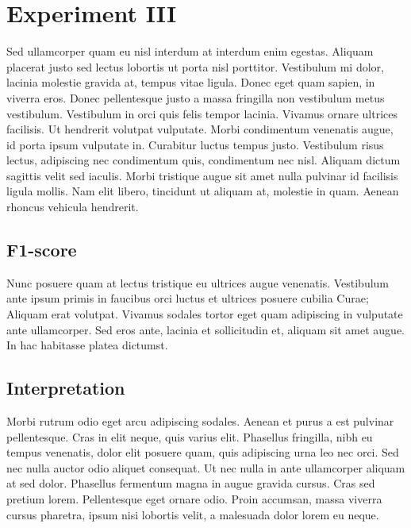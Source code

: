 
\section{Experiment III}

Sed ullamcorper quam eu nisl interdum at interdum enim egestas. Aliquam placerat justo sed lectus lobortis ut porta nisl porttitor. Vestibulum mi dolor, lacinia molestie gravida at, tempus vitae ligula. Donec eget quam sapien, in viverra eros. Donec pellentesque justo a massa fringilla non vestibulum metus vestibulum. Vestibulum in orci quis felis tempor lacinia. Vivamus ornare ultrices facilisis. Ut hendrerit volutpat vulputate. Morbi condimentum venenatis augue, id porta ipsum vulputate in. Curabitur luctus tempus justo. Vestibulum risus lectus, adipiscing nec condimentum quis, condimentum nec nisl. Aliquam dictum sagittis velit sed iaculis. Morbi tristique augue sit amet nulla pulvinar id facilisis ligula mollis. Nam elit libero, tincidunt ut aliquam at, molestie in quam. Aenean rhoncus vehicula hendrerit.

\subsection{F1-score}

Nunc posuere quam at lectus tristique eu ultrices augue venenatis. Vestibulum ante ipsum primis in faucibus orci luctus et ultrices posuere cubilia Curae; Aliquam erat volutpat. Vivamus sodales tortor eget quam adipiscing in vulputate ante ullamcorper. Sed eros ante, lacinia et sollicitudin et, aliquam sit amet augue. In hac habitasse platea dictumst.


\subsection{Interpretation}
Morbi rutrum odio eget arcu adipiscing sodales. Aenean et purus a est pulvinar pellentesque. Cras in elit neque, quis varius elit. Phasellus fringilla, nibh eu tempus venenatis, dolor elit posuere quam, quis adipiscing urna leo nec orci. Sed nec nulla auctor odio aliquet consequat. Ut nec nulla in ante ullamcorper aliquam at sed dolor. Phasellus fermentum magna in augue gravida cursus. Cras sed pretium lorem. Pellentesque eget ornare odio. Proin accumsan, massa viverra cursus pharetra, ipsum nisi lobortis velit, a malesuada dolor lorem eu neque.

